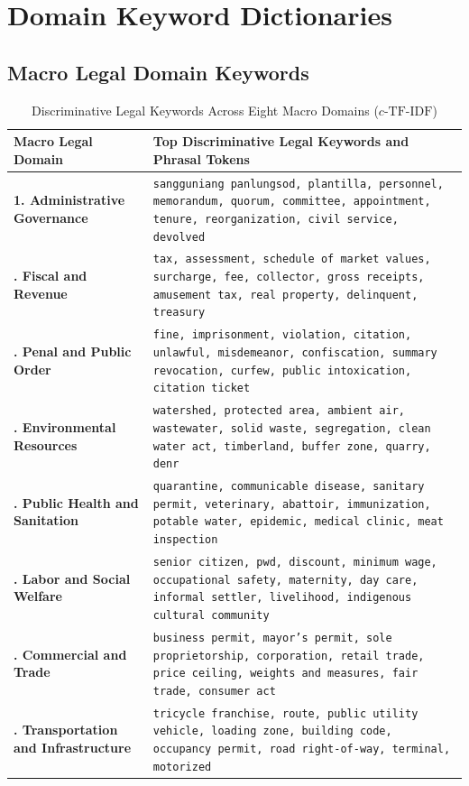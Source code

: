 \chapter{Domain Keyword Dictionaries}
\label{app:corpus_census_typology}

\section{Macro Legal Domain Keywords}
\label{sec:app_macro_domain_dictionaries}

\begin{table}[htbp]
    \centering
    \scriptsize
    \caption[Discriminative Legal Keywords Across Eight Macro Domains]{Discriminative Legal Keywords Across Eight Macro Domains ($c\text{-}\mathrm{TF}\text{-}\mathrm{IDF}$)}
    \label{tab:app_macro_domain_keywords}
    \begin{tabularx}{\linewidth}{>{\bfseries}p{4.2cm}>{\RaggedRight\arraybackslash}X}
        \toprule
        \textbf{Macro Legal Domain} & \textbf{Top Discriminative Legal Keywords and Phrasal Tokens} \\
        \midrule
        1. Administrative Governance & \texttt{sangguniang panlungsod, plantilla, personnel, memorandum, quorum, committee, appointment, tenure, reorganization, civil service, devolved} \\
        \addlinespace[2pt]
        2. Fiscal and Revenue & \texttt{tax, assessment, schedule of market values, surcharge, fee, collector, gross receipts, amusement tax, real property, delinquent, treasury} \\
        \addlinespace[2pt]
        3. Penal and Public Order & \texttt{fine, imprisonment, violation, citation, unlawful, misdemeanor, confiscation, summary revocation, curfew, public intoxication, citation ticket} \\
        \addlinespace[2pt]
        4. Environmental Resources & \texttt{watershed, protected area, ambient air, wastewater, solid waste, segregation, clean water act, timberland, buffer zone, quarry, denr} \\
        \addlinespace[2pt]
        5. Public Health and Sanitation & \texttt{quarantine, communicable disease, sanitary permit, veterinary, abattoir, immunization, potable water, epidemic, medical clinic, meat inspection} \\
        \addlinespace[2pt]
        6. Labor and Social Welfare & \texttt{senior citizen, pwd, discount, minimum wage, occupational safety, maternity, day care, informal settler, livelihood, indigenous cultural community} \\
        \addlinespace[2pt]
        7. Commercial and Trade & \texttt{business permit, mayor's permit, sole proprietorship, corporation, retail trade, price ceiling, weights and measures, fair trade, consumer act} \\
        \addlinespace[2pt]
        8. Transportation and Infrastructure & \texttt{tricycle franchise, route, public utility vehicle, loading zone, building code, occupancy permit, road right-of-way, terminal, motorized} \\
        \bottomrule
    \end{tabularx}
\end{table}
